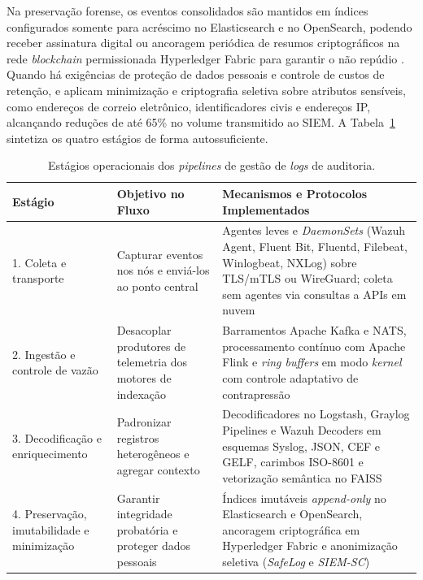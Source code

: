 Na preservação forense, os eventos consolidados são mantidos em índices configurados somente para acréscimo no Elasticsearch e no OpenSearch, podendo receber assinatura digital ou ancoragem periódica de resumos criptográficos na rede \textit{blockchain} permissionada Hyperledger Fabric para garantir o não repúdio \cite{shao2026b,devarajulu2025,aftab2026}. Quando há exigências de proteção de dados pessoais e controle de custos de retenção,  e  aplicam minimização e criptografia seletiva sobre atributos sensíveis, como endereços de correio eletrônico, identificadores civis e endereços IP, alcançando reduções de até 65\% no volume transmitido ao SIEM. A Tabela~\ref{tab:rsl_qs04} sintetiza os quatro estágios de forma autossuficiente.

\begin{table}[!htbp]
    \centering
    \caption{Estágios operacionais dos \textit{pipelines} de gestão de \textit{logs} de auditoria.}
    \label{tab:rsl_qs04}
    \footnotesize
    \begin{tabular}{p{3.2cm}p{3.9cm}p{6.9cm}}
        \hline
        \textbf{Estágio} & \textbf{Objetivo no Fluxo} & \textbf{Mecanismos e Protocolos Implementados} \\ \hline
        1. Coleta e transporte & Capturar eventos nos nós e enviá-los ao ponto central & Agentes leves e \textit{DaemonSets} (Wazuh Agent, Fluent Bit, Fluentd, Filebeat, Winlogbeat, NXLog) sobre TLS/mTLS ou WireGuard; coleta sem agentes via consultas a APIs em nuvem \\ \hline
        2. Ingestão e controle de vazão & Desacoplar produtores de telemetria dos motores de indexação & Barramentos Apache Kafka e NATS, processamento contínuo com Apache Flink e \textit{ring buffers} em modo \textit{kernel} com controle adaptativo de contrapressão \\ \hline
        3. Decodificação e enriquecimento & Padronizar registros heterogêneos e agregar contexto & Decodificadores no Logstash, Graylog Pipelines e Wazuh Decoders em esquemas Syslog, JSON, CEF e GELF, carimbos ISO-8601 e vetorização semântica no FAISS \\ \hline
        4. Preservação, imutabilidade e minimização & Garantir integridade probatória e proteger dados pessoais & Índices imutáveis \textit{append-only} no Elasticsearch e OpenSearch, ancoragem criptográfica em Hyperledger Fabric e anonimização seletiva (\textit{SafeLog} e \textit{SIEM-SC}) \\ \hline
    \end{tabular}
\end{table}
\FloatBarrier

